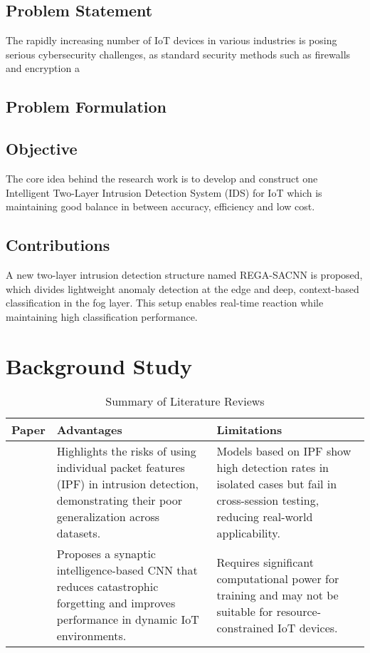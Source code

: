\documentclass[a4paper,fleqn]{cas-dc}
\numberwithin{equation}{section}
\begin{document}
\subsection{Problem Statement}
The rapidly increasing number of IoT devices in various industries is posing serious cybersecurity challenges, as standard security methods such as firewalls and encryption a


\subsection*{Problem Formulation}





\subsection{Objective}
The core idea behind the research work is to develop and construct one Intelligent Two-Layer Intrusion Detection System (IDS) for IoT which is maintaining good balance in between accuracy, efficiency and low cost. 

\subsection{Contributions}


A new two-layer intrusion detection structure named REGA-SACNN is proposed, which divides lightweight anomaly detection at the edge and deep, context-based classification in the fog layer. This setup enables real-time reaction while maintaining high classification performance.



\section{Background Study}


\begin{table*}[htbp]
\centering
\caption{Summary of Literature Reviews}
\label{tab:tab1}
\begin{tabular}{p{1cm} p{8cm} p{7cm}}
\toprule
\textbf{Paper} & \textbf{Advantages} & \textbf{Limitations} \\
\midrule
\cite{Kostas2025} & Highlights the risks of using individual packet features (IPF) in intrusion detection, demonstrating their poor generalization across datasets. & Models based on IPF show high detection rates in isolated cases but fail in cross-session testing, reducing real-world applicability. \\
\cite{chen2025sicnn} & Proposes a synaptic intelligence-based CNN that reduces catastrophic forgetting and improves performance in dynamic IoT environments. & Requires significant computational power for training and may not be suitable for resource-constrained IoT devices. \\
\bottomrule
\end{tabular}
\end{table*}
\end{document}
